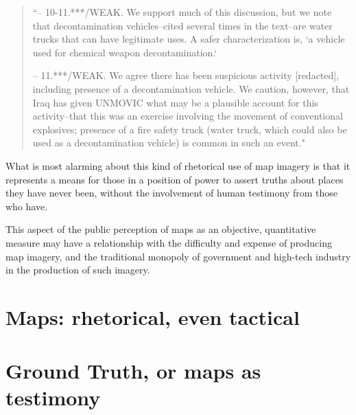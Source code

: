 \documentclass[11pt]{report}
\begin{document}
\begin{quote}
	``-- 10-11.***/WEAK. We support much of this discussion, but we note that decontamination vehicles--cited several times in the text--are water trucks that can have legitimate uses. A safer characterization is, `a vehicle used for chemical weapon decontamination.`

-- 11.***/WEAK. We agree there has been suspicious activity [redacted], including presence of a decontamination vehicle. We caution, however, that Iraq has given UNMOVIC what may be a plausible account for this activity--that this was an exercise involving the movement of conventional explosives; presence of a fire safety truck (water truck, which could also be used as a decontamination vehicle) is common in such an event."
	\cite{senate2004report}
\end{quote} 


What is most alarming about this kind of rhetorical use of map imagery is that it represents a means for those in a position of power to assert truths about places they have never been, without the involvement of human testimony from those who have.

This aspect of the public perception of maps as an objective, quantitative measure may have a relationship with the difficulty and expense of producing map imagery, and the traditional monopoly of government and high-tech industry in the production of such imagery.

\section{Maps: rhetorical, even tactical}
\section{Ground Truth, or maps as testimony}
\end{document}
